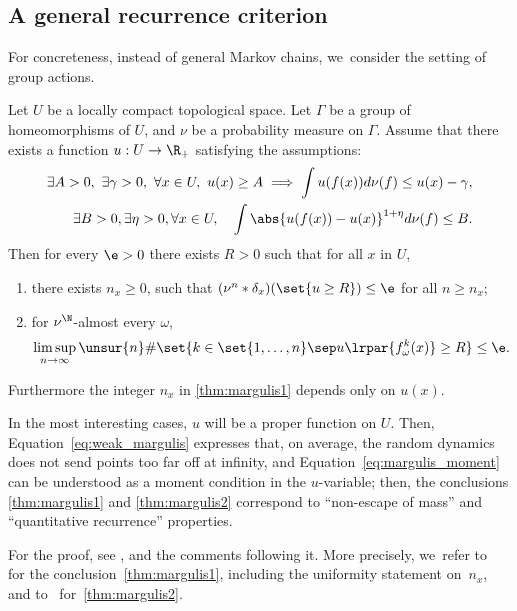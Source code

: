 \subsection{A general recurrence criterion}
For concreteness, instead of general Mar\-kov chains, we~consider the setting of group actions.

\begin{thm}\label{thm:margulis} Let $U$ be a locally compact topological space. Let $\Gamma$ be a group of homeomorphisms of $U$, and $\nu$ be a probability measure on $\Gamma$.
Assume that there exists a function $u:U\to \R_+$ satisfying the assumptions:
\begin{eqnarray}
\label{eq:weak_margulis}
\exists A>0, \ \exists \gamma>0, \ \forall x\in U, \ u(x)\geq A \implies
\int u(f(x))d\nu(f) \leq u(x) - \gamma, \\
\label{eq:margulis_moment}
\exists B>0, \exists \eta>0, \forall x\in U, \quad \int \abs{u(f(x)) - u(x) } ^{1+\eta} d\nu(f) \leq B.
\end{eqnarray}
Then for every $\e>0$ there exists $R>0$ such that for all $x$ in $U$,
\begin{enumerate}
\item\label{thm:margulis1} there exists $n_x\geq 0$, such that $(\nu^{n}\ast \delta_x )(\set{u\geq R}) \leq \e$ for all $n\geq n_x$;
\item\label{thm:margulis2} for $\nu^\N$-almost every $\omega$,
\[
\limsup_{n\to\infty} \unsur{n} \# \set{k\in \set{1, \ldots, n} \sep  u \lrpar{f^k_\omega(x) }\geq R} \leq \e.
\]
\end{enumerate}
Furthermore the integer $n_x$ in \eqref{thm:margulis1} depends only on $u(x)$.
\end{thm}

In the most interesting cases, $u$ will be a proper function on $U$. Then, Equation~\eqref{eq:weak_margulis}
expresses that, on average, the random dynamics does not send points too far off at infinity,
and Equation~\eqref{eq:margulis_moment} can be understood as a moment condition in the $u$\nobreakdash-vari\-able; then, the conclusions \eqref{thm:margulis1} and \eqref{thm:margulis2} correspond to ``non-escape of mass'' and ``quantitative recurrence'' properties.

For the proof, see \cite[Prop.\,1.2]{benard-desaxce}, and the comments following it. More
precisely, we~refer to~\cite[Prop.\,2.5]{benard-desaxce} for the conclusion~\eqref{thm:margulis1},
including the uniformity statement on~$n_x$, and to~\cite[Prop.\,2.7]{benard-desaxce} for~\eqref{thm:margulis2}.

